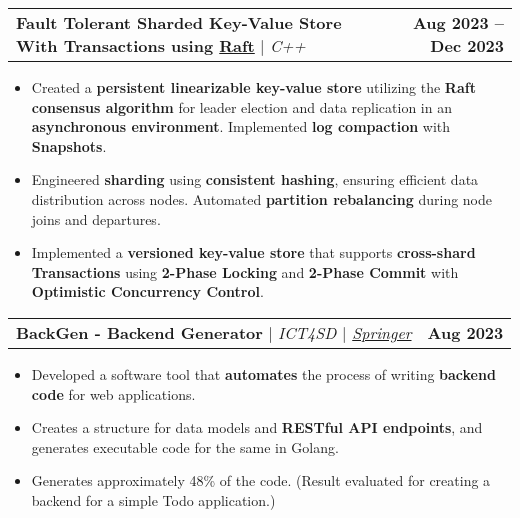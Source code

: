 \documentclass[letterpaper,11pt]{article}
\makeatletter
\newcommand{\resumeItem}[1]{
  \item\small{
    {#1 \vspace{-2pt}}
  }
}
\newcommand{\resumeProjectHeading}[2]{
    \item
    \begin{tabular*}{1.001\textwidth}{l@{\extracolsep{\fill}}r}
      \small#1 & \textbf{\small #2}\\
    \end{tabular*}\vspace{-7pt}
}
\newcommand{\resumeItemListStart}{\begin{itemize}}
\newcommand{\resumeItemListEnd}{\end{itemize}\vspace{-5pt}}
\makeatother
\begin{document}
        \resumeProjectHeading
            {\textbf{\normalsize{Fault Tolerant Sharded Key-Value Store With Transactions using \href{https://raft.github.io/raft.pdf}{Raft}}} $|$ \emph{C++}}{Aug 2023 -- Dec 2023}
            \resumeItemListStart
                \resumeItem{Created a \textbf{persistent linearizable key-value store} utilizing the \textbf{Raft consensus algorithm} for leader election and data replication in an \textbf{asynchronous environment}. Implemented \textbf{log compaction} with \textbf{Snapshots}.}
                \resumeItem{Engineered \textbf{sharding} using \textbf{consistent hashing}, ensuring efficient data distribution across nodes. Automated \textbf{partition rebalancing} during node joins and departures.}
                \resumeItem{Implemented a \textbf{versioned key-value store} that supports \textbf{cross-shard Transactions} using \textbf{2-Phase Locking} and \textbf{2-Phase Commit} with \textbf{Optimistic Concurrency Control}.}
            \resumeItemListEnd
        \vspace{-17pt}

        \resumeProjectHeading
            {\textbf{\normalsize{BackGen - Backend Generator}} $|$ \emph{ICT4SD $|$ \href{https://link.springer.com/chapter/10.1007/978-981-99-6568-7_34}{Springer}}}{Aug 2023}
            \resumeItemListStart
                \resumeItem{Developed a software tool that \textbf{automates} the process of writing \textbf{backend code} for web applications.}
                \resumeItem{Creates a structure for data models and \textbf{RESTful API endpoints}, and generates executable code for the same in Golang.}
                \resumeItem{Generates approximately 48\% of the code. (Result evaluated for creating a backend for a simple Todo application.)}
            \resumeItemListEnd
        \vspace{-17pt}

        
\end{document}
